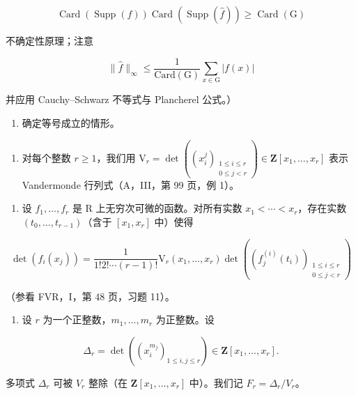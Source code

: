 \[
\operatorname{Card} (\operatorname{Supp} (f)) \operatorname{Card} (\operatorname{Supp} (\widehat {f})) \geqslant \operatorname{Card} (\mathrm{G})
\]

不确定性原理；注意

\[
\| \widehat {f} \| _ {\infty} \leqslant \frac {1}{\mathrm{Card(G)}} \sum_ {x \in \mathrm{G}} | f (x) |
\]

并应用 Cauchy–Schwarz 不等式与 Plancherel 公式。）

\begin{enumerate}
\def\labelenumi{\alph{enumi})}
\setcounter{enumi}{1}
\tightlist
\item
  确定等号成立的情形。
\end{enumerate}

\begin{enumerate}
\def\labelenumi{\arabic{enumi})}
\setcounter{enumi}{32}
\tightlist
\item
  对每个整数 \(r \geqslant 1\)，我们用 \(\mathrm{V}_{r} = \det((x_{i}^{j})_{\substack{1 \leqslant i \leqslant r \\ 0 \leqslant j < r}}) \in \mathbf{Z}[x_{1}, \ldots, x_{r}]\) 表示 Vandermonde 行列式（A，III，第 99 页，例 1）。
\end{enumerate}

\begin{enumerate}
\def\labelenumi{\alph{enumi})}
\tightlist
\item
  设 \(f_{1}, \ldots, f_{r}\) 是 R 上无穷次可微的函数。对所有实数 \(x_{1} < \cdots < x_{r}\)，存在实数 \((t_{0}, \ldots, t_{r-1})\)（含于 \([x_{1}, x_{r}]\) 中）使得
\end{enumerate}

\[
\det (f_{i}(x_{j})) = \frac{1}{1!2!\cdots(r - 1)!}\mathrm{V}_{r}(x_{1},\ldots ,x_{r})\det ((f_{j}^{(i)}(t_{i}))_{\substack{1\leqslant i\leqslant r\\ 0\leqslant j <   r}})
\]

（参看 FVR，I，第 48 页，习题 11）。

\begin{enumerate}
\def\labelenumi{\alph{enumi})}
\setcounter{enumi}{1}
\tightlist
\item
  设 \(r\) 为一个正整数，\(m_1, \ldots, m_r\) 为正整数。设
\end{enumerate}

\[
\Delta_ {r} = \det ((x _ {i} ^ {m _ {j}}) _ {1 \leqslant i, j \leqslant r}) \in \mathbf {Z} [ x _ {1}, \dots , x _ {r} ].
\]

多项式 \(\Delta_r\) 可被 \(V_r\) 整除（在 \(\mathbf{Z}[x_1, \ldots, x_r]\) 中）。我们记 \(F_r = \Delta_r / V_r\)。

